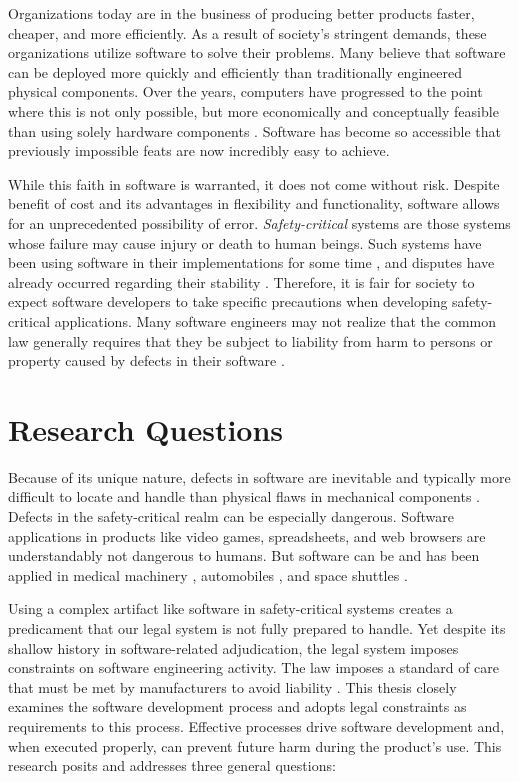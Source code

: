 \documentclass[12pt]{report}
\begin{document}
Organizations today are in the business of producing better products faster, cheaper, and more efficiently. As a result of society's stringent demands, these organizations utilize software to solve their problems. Many believe that software can be deployed more quickly and efficiently than traditionally engineered physical components. Over the years, computers have progressed to the point where this is not only possible, but more economically and conceptually feasible than using solely hardware components \cite{FAKE}. Software has become so accessible that previously impossible feats are now incredibly easy to achieve. 

While this faith in software is warranted, it does not come without risk. Despite benefit of cost and its advantages in flexibility and functionality, software allows for an unprecedented possibility of error. \textit{Safety-critical} systems are those systems whose failure may cause injury or death to human beings. Such systems have been using software in their implementations for some time \cite{FAKE}, and disputes have already occurred regarding their stability \cite{FAKE}. Therefore, it is fair for society to expect software developers to take specific precautions when developing safety-critical applications. Many software engineers may not realize that the common law generally requires that they be subject to liability from harm to persons or property caused by defects in their software \cite{FAKE}. 

\section{Research Questions} 

Because of its unique nature, defects in software are inevitable and typically more difficult to locate and handle than physical flaws in mechanical components \cite{FAKE}. Defects in the safety-critical realm can be especially dangerous. Software applications in products like video games, spreadsheets, and web browsers are understandably not dangerous to humans. But software can be and has been applied in medical machinery \cite{FAKE}, automobiles \cite{FAKE}, and space shuttles \cite{FAKE}.

Using a complex artifact like software in safety-critical systems creates a predicament that our legal system is not fully prepared to handle. Yet despite its shallow history in software-related adjudication, the legal system imposes constraints on software engineering activity. The law imposes a standard of care that must be met by manufacturers to avoid liability \cite{FAKE}. This thesis closely examines the software development process and adopts legal constraints as requirements to this process. Effective processes drive software development and, when executed properly, can prevent future harm during the product's use. This research posits and addresses three general questions: 
\end{document}

